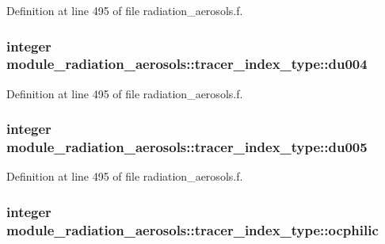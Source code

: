 Definition at line 495 of file radiation\+\_\+aerosols.\+f.

\subsubsection[{\texorpdfstring{du004}{du004}}]{\setlength{\rightskip}{0pt plus 5cm}integer module\+\_\+radiation\+\_\+aerosols\+::tracer\+\_\+index\+\_\+type\+::du004\hspace{0.3cm}{\ttfamily [private]}}\hypertarget{structmodule__radiation__aerosols_1_1tracer__index__type_a69658f70ffccecfae1751c227ec1b14c}{}\label{structmodule__radiation__aerosols_1_1tracer__index__type_a69658f70ffccecfae1751c227ec1b14c}


Definition at line 495 of file radiation\+\_\+aerosols.\+f.

\subsubsection[{\texorpdfstring{du005}{du005}}]{\setlength{\rightskip}{0pt plus 5cm}integer module\+\_\+radiation\+\_\+aerosols\+::tracer\+\_\+index\+\_\+type\+::du005\hspace{0.3cm}{\ttfamily [private]}}\hypertarget{structmodule__radiation__aerosols_1_1tracer__index__type_aabd67af89106955952b0010bb3a70e4e}{}\label{structmodule__radiation__aerosols_1_1tracer__index__type_aabd67af89106955952b0010bb3a70e4e}


Definition at line 495 of file radiation\+\_\+aerosols.\+f.

\subsubsection[{\texorpdfstring{ocphilic}{ocphilic}}]{\setlength{\rightskip}{0pt plus 5cm}integer module\+\_\+radiation\+\_\+aerosols\+::tracer\+\_\+index\+\_\+type\+::ocphilic\hspace{0.3cm}{\ttfamily [private]}}\hypertarget{structmodule__radiation__aerosols_1_1tracer__index__type_a95e99f68fc7344f78f2ee316bc447651}{}\label{structmodule__radiation__aerosols_1_1tracer__index__type_a95e99f68fc7344f78f2ee316bc447651}


